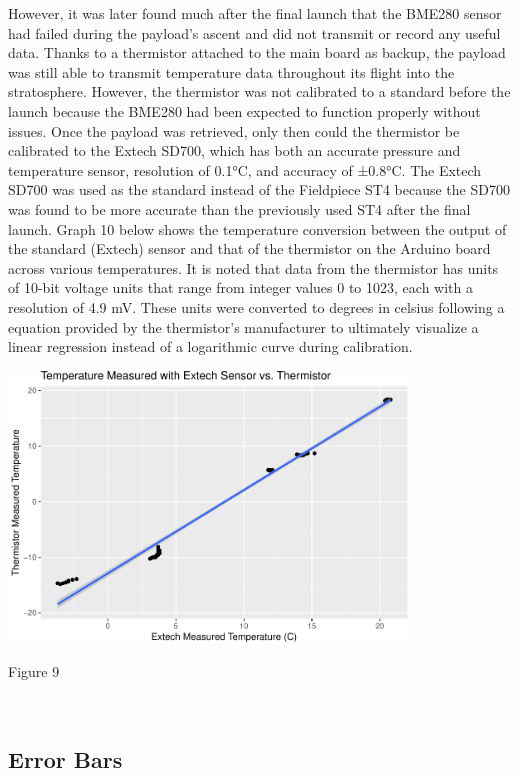 \documentclass[12pt,]{article}
\begin{document}
However, it was later found much after the final launch that the BME280
sensor had failed during the payload's ascent and did not transmit or
record any useful data. Thanks to a thermistor attached to the main
board as backup, the payload was still able to transmit temperature data
throughout its flight into the stratosphere. However, the thermistor was
not calibrated to a standard before the launch because the BME280 had
been expected to function properly without issues. Once the payload was
retrieved, only then could the thermistor be calibrated to the Extech
SD700, which has both an accurate pressure and temperature sensor,
resolution of 0.1°C, and accuracy of ±0.8°C. The Extech SD700 was used
as the standard instead of the Fieldpiece ST4 because the SD700 was
found to be more accurate than the previously used ST4 after the final
launch. Graph 10 below shows the temperature conversion between the
output of the standard (Extech) sensor and that of the thermistor on the
Arduino board across various temperatures. It is noted that data from
the thermistor has units of 10-bit voltage units that range from integer
values 0 to 1023, each with a resolution of 4.9 mV. These units were
converted to degrees in celsius following a equation provided by the
thermistor's manufacturer to ultimately visualize a linear regression
instead of a logarithmic curve during calibration.

\begin{center}\includegraphics[width=400px]{paper_files/figure-latex/temp2-1} \end{center}

Figure 9

~

\subsection{Error Bars}\label{error-bars}
\end{document}

